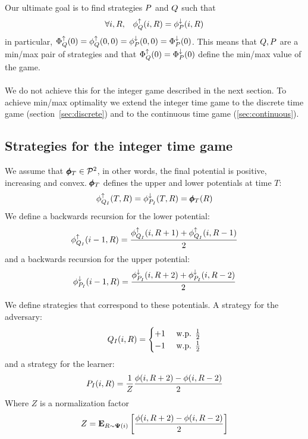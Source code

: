 \documentclass{article}[12pt]
\begin{document}
Our ultimate goal is to find strategies $P$ and
$Q$ such that
\begin{equation} \label{eqn:limitPotential}
\forall i,R,\;\;\; \phi_{Q}^{\uparrow}(i,R) = \phi_{P}^{\downarrow}(i,R)
\end{equation}
in particular, $\Phi_{Q}^{\uparrow}(0)=\phi_{Q}^{\uparrow}(0,0) =
\phi_{P}^{\downarrow}(0,0)=\Phi_{P}^{\downarrow}(0)$. This means that
$Q,P$ are a min/max pair of strategies and that
$\Phi_{Q}^{\uparrow}(0)=\Phi_{P}^{\downarrow}(0)$ define the min/max value of the game.
~\\~\\
We do not achieve this for the integer game described in the next
section. To achieve min/max optimality we extend the integer time game
to the discrete time game (section~\ref{sec:discrete}) and to the
continuous time game (\ref{sec:continuous}).

\subsection{Strategies for the integer time  game} \label{sec:strat-integer}
We assume that $\pmb{\phi}_{T}  \in {\cal P}^{2}$, in other words, the final
potential is positive, increasing and convex. $\pmb{\phi}_{T}$ defines the
upper and lower potentials at time $T$:
$$\phi_{Q_I}^{\uparrow}(T,R) = \phi_{P_I}^{\downarrow}(T,R) = \pmb{\phi}_{T}(R) $$
We define a backwards recursion for the lower potential:
\begin{equation} \label{eqn:backward-iteration-lower}
  \phi_{Q_I}^{\uparrow}(i-1, R) = \frac{\phi_{Q_I}^{\uparrow}(i,R+1) + \phi_{Q_I}^{\uparrow}(i,R-1)}{2}
\end{equation}
and a backwards recursion for the upper potential:
\begin{equation} \label{eqn:backward-iteration-upper-recursion}
  \phi_{P_I}^{\downarrow}(i-1, R) = \frac{\phi_{P_I}^{\downarrow}(i,R+2) + \phi_{P_I}^{\downarrow}(i,R-2)}{2}
\end{equation}

We define strategies that correspond to these potentials. A strategy
for the adversary:
\begin{equation} \label{eqn:adv-strat-p}
  Q_I(i,R) =
  \begin{cases}
    +1 & \mbox{ w.p. } \frac{1}{2}\\
    -1 & \mbox{ w.p. } \frac{1}{2}\\
  \end{cases}
\end{equation}
and a strategy for the learner:
\begin{equation} \label{eqn:learner-strat-1}
P_I(i,R) = \frac{1}{Z} \frac{\phi(i,R+2) - \phi(i,R-2)}{2}
\end{equation}
Where $Z$ is a normalization factor
$$Z = {\bf E}_{R \sim {\bf \Psi}(i)}\left[ \frac{\phi(i,R+2) - \phi(i,R-2)}{2} \right]$$
\end{document}
